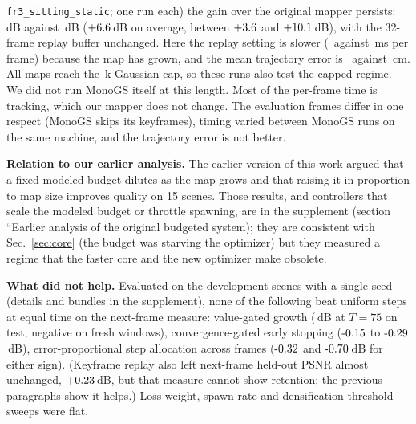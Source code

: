 \documentclass[10pt,twocolumn,letterpaper]{article}
\begin{document}
\texttt{fr3\_sitting\_static}; one run each) the gain over the original mapper persists: \engFullJrPsnr\,dB against \engFullOrigPsnr\,dB ($+6.6$\,dB on average, between $+3.6$ and $+10.1$\,dB), with the 32-frame replay buffer unchanged. Here the replay setting is slower (\engFullJrMs\ against \engFullOrigMs\,ms per frame) because the map has grown, and the mean trajectory error is \engFullJrAte\ against \engFullOrigAte\,cm. All maps reach the \engFullNMax\,k-Gaussian cap, so these runs also test the capped regime. We did not run MonoGS itself at this length. Most of the per-frame time is tracking, which our mapper does not change. The evaluation frames differ in one respect (MonoGS skips its keyframes), timing varied between MonoGS runs on the same machine, and the trajectory error is not better.



\textbf{Relation to our earlier analysis.} The earlier version of this work argued that a fixed modeled budget dilutes as the map grows and that raising it in proportion to map size improves quality on 15 scenes. Those results, and controllers that scale the modeled budget or throttle spawning, are in the supplement (section ``Earlier analysis of the original budgeted system); they are consistent with Sec.~\ref{sec:core} (the budget was starving the optimizer) but they measured a regime that the faster core and the new optimizer make obsolete.

\textbf{What did not help.} Evaluated on the development scenes with a single seed (details and bundles in the supplement), none of the following beat uniform steps at equal time on the next-frame measure: value-gated growth (\engTestTtsVggTSevenFiveEqMean\,dB at $T{=}75$ on test, negative on fresh windows), convergence-gated early stopping ($\engNegEarlyZeroZeroThree$ to $\engNegEarlyZeroZeroOneFive$\,dB), error-proportional step allocation across frames ($\engNegAllocPos$ and $\engNegAllocNeg$\,dB for either sign). (Keyframe replay also left next-frame held-out PSNR almost unchanged, $+0.23$\,dB, but that measure cannot show retention; the previous paragraphs show it helps.) Loss-weight, spawn-rate and densification-threshold sweeps were flat.
\end{document}
